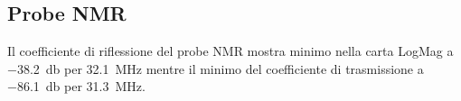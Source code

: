 \documentclass[main.tex]{subfiles}
\begin{document}
\subsection{Probe NMR}

Il coefficiente di riflessione del probe NMR mostra minimo  nella carta LogMag a \SI{-38.2}{\decibel} per \SI{32.1}{\mega\hertz} mentre il minimo del coefficiente di trasmissione a \SI{-86.1}{\decibel} per \SI{31.3}{\mega\hertz}.


\end{document}
